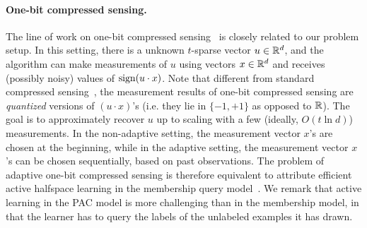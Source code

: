 

\paragraph{One-bit compressed sensing.} The line of work on one-bit compressed sensing~\citep{BB08} is closely related to our problem setup. In this setting,
there is a unknown $t$-sparse vector $u \in \mathbb{R}^d$, and the algorithm can make measurements of $u$ using vectors $x \in \mathbb{R}^d$ and receives (possibly noisy) values of $\operatorname{sign}(u \cdot x)$.
Note that different from standard compressed sensing~\citep{CT06,D06}, the measurement results of one-bit compressed sensing are {\em quantized} versions of $(u \cdot x)$'s (i.e. they lie in $\{-1,+1\}$ as opposed to $\mathbb{R}$).
The goal is to approximately recover $u$ up to scaling with a few (ideally, $O(t \ln d)$) measurements.
 In the non-adaptive setting, the measurement vector
$x$'s are chosen at the beginning, while in the adaptive setting, the measurement vector $x$'s can be chosen sequentially,
based on past observations.
The problem of adaptive one-bit compressed sensing is therefore equivalent to attribute efficient
active halfspace learning in the membership query model~\citep{A88}.
We remark that active learning in the PAC model is more challenging than in the membership model, in that the learner has to query the labels of the unlabeled examples it has drawn.


